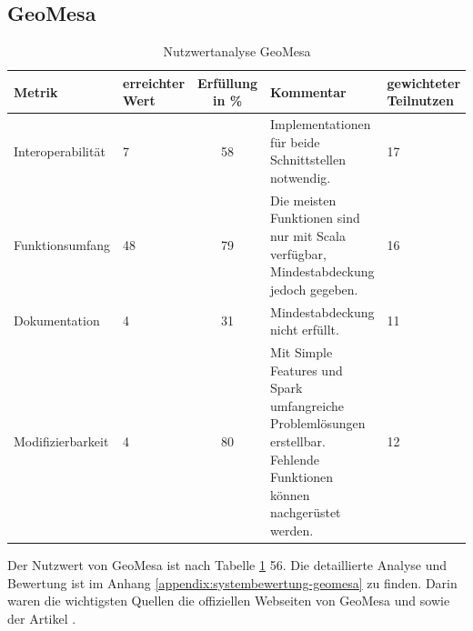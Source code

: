 \subsection{GeoMesa}
\begin{table}[h!]
\centering
\small
\begin{tabular}{l|p{1.8cm}|c|p{3.1cm}|p{1.8cm}}
\textbf{Metrik} & \textbf{erreichter Wert} & \textbf{Erfüllung in \%} & \textbf{Kommentar} & \textbf{gewichteter Teilnutzen} \\ \hline
Interoperabilität & 7 & 58 & Implementationen für beide Schnittstellen notwendig. & 17 \\ \hline
Funktionsumfang & 48 & 79 & Die meisten Funktionen sind nur mit Scala verfügbar, Mindestabdeckung jedoch gegeben. & 16 \\ \hline
Dokumentation & 4 & 31 & Mindestabdeckung nicht erfüllt. & 11 \\ \hline
Modifizierbarkeit & 4 & 80 & Mit Simple Features und Spark umfangreiche Problemlösungen erstellbar. Fehlende Funktionen können nachgerüstet werden. & 12 \\
\end{tabular}
\caption{Nutzwertanalyse GeoMesa}
\label{table:nutzwertanalyse-geomesa}
\end{table}
Der Nutzwert von GeoMesa ist nach Tabelle \ref{table:nutzwertanalyse-geomesa} 56.
Die detaillierte Analyse und Bewertung ist im Anhang \ref{appendix:systembewertung-geomesa} zu finden.
Darin waren die wichtigsten Quellen die offiziellen Webseiten von GeoMesa \cite{website:geomesa-tutorials} und \cite{website:geomesa-simplefeatures} sowie der Artikel \cite{website:geomesaeclipse}.

